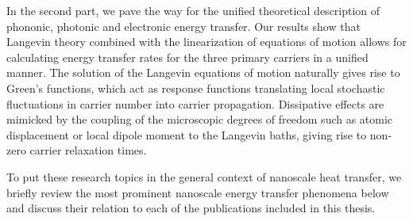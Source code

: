 In the second part, we pave the way for the unified theoretical description of phononic, photonic and electronic energy transfer. Our results show that Langevin theory \cite{langevin,zwanzig} combined with the linearization of equations of motion allows for calculating energy transfer rates for the three primary carriers in a unified manner. The solution of the Langevin equations of motion naturally gives rise to Green's functions, which act as response functions translating local stochastic fluctuations in carrier number into carrier propagation. Dissipative effects are mimicked by the coupling of the microscopic degrees of freedom such as atomic displacement or local dipole moment to the Langevin baths, giving rise to non-zero carrier relaxation times.

To put these research topics in the general context of nanoscale heat transfer, we briefly review the most prominent nanoscale energy transfer phenomena below and discuss their relation to each of the publications included in this thesis. 



